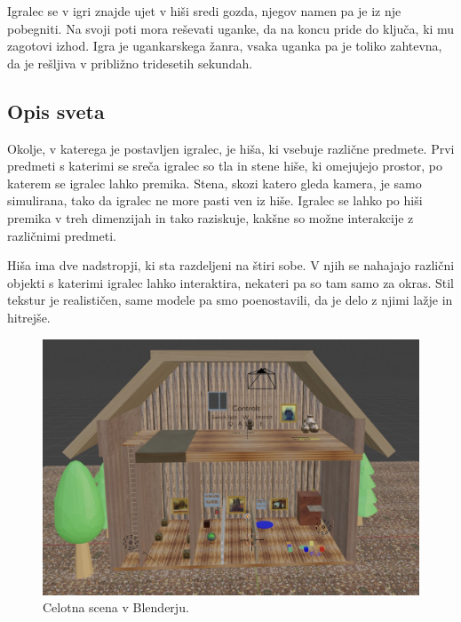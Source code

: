 \documentclass[a4paper,12pt]{article}
\begin{document}
Igralec se v igri znajde ujet v hiši sredi gozda, njegov namen pa je iz nje pobegniti. Na svoji poti mora reševati uganke, da na koncu pride do ključa, ki mu zagotovi izhod. Igra je ugankarskega žanra, vsaka uganka pa je toliko zahtevna, da je rešljiva v približno tridesetih sekundah.

\subsection{Opis sveta}
Okolje, v katerega je postavljen igralec, je hiša, ki vsebuje različne predmete. Prvi predmeti s katerimi se sreča igralec so tla in stene hiše, ki omejujejo prostor, po katerem se igralec lahko premika. Stena, skozi katero gleda kamera, je samo simulirana, tako da igralec ne more pasti ven iz hiše. Igralec se lahko po hiši premika v treh dimenzijah in tako raziskuje, kakšne so možne interakcije z različnimi predmeti.

Hiša ima dve nadstropji, ki sta razdeljeni na štiri sobe. V njih se nahajajo različni objekti s katerimi igralec lahko interaktira, nekateri pa so tam samo za okras. Stil tekstur je realističen, same modele pa smo poenostavili, da je delo z njimi lažje in hitrejše.

\begin{figure}[!htb]
    \begin{center}
        \includegraphics[width=\columnwidth]{svet.jpg}
        \caption{Celotna scena v Blenderju.}
    \end{center}
\end{figure}
\end{document}
